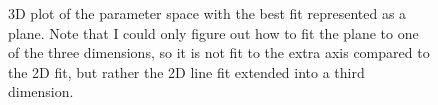 \documentclass[twocolumn,11pt]{article}
\begin{document}
\begin{figure}[!h]
	\centering
	\noindent
      \caption{3D plot of the parameter space with the best fit represented as a plane. Note that I could only figure out how to fit the plane to one of the three dimensions, so it is not fit to the extra axis compared to the 2D fit, but rather the 2D line fit extended into a third dimension.}
\end{figure}
\end{document}
